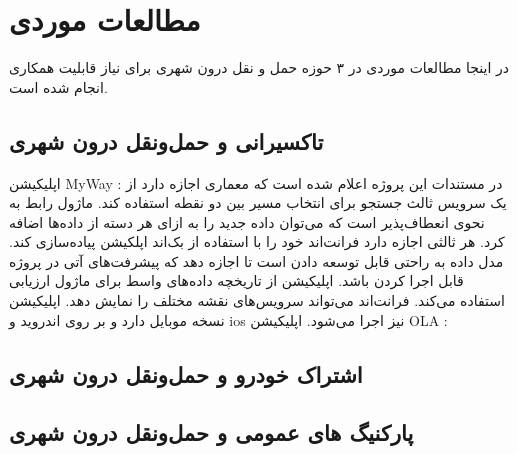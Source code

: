 \section{مطالعات موردی}
در اینجا مطالعات موردی در ۳ حوزه حمل و نقل درون شهری برای نیاز قابلیت همکاری انجام شده است. 
\subsection{تاکسیرانی و حمل‌و‌نقل درون شهری}

اپلیکیشن MyWay : در مستندات این پروژه اعلام شده است که معماری اجازه دارد از یک سرویس ثالث جستجو برای انتخاب مسیر بین دو نقطه استفاده کند. ماژول رابط به نحوی انعطاف‌پذیر است که می‌توان داده جدید را به ازای هر دسته از داده‌ها اضافه کرد. هر ثالثی اجازه دارد فرانت‌اند خود را با استفاده از بک‌اند اپلکیشن پیاده‌سازی کند. مدل داده به راحتی قابل توسعه دادن است تا اجازه دهد که پیشرفت‌های آتی در پروژه قابل اجرا کردن باشد. اپلیکیشن از تاریخچه داده‌های واسط برای ماژول ارزیابی استفاده می‌کند. فرانت‌اند می‌تواند سرویس‌های نقشه مختلف را نمایش دهد. اپلیکیشن نسخه موبایل دارد و بر روی اندروید و ios نیز اجرا می‌شود. 
اپلیکیشن OLA : 

\subsection{اشتراک خودرو و حمل‌و‌نقل درون شهری}


\subsection{پارکنیگ های عمومی و حمل‌و‌نقل درون شهری}

